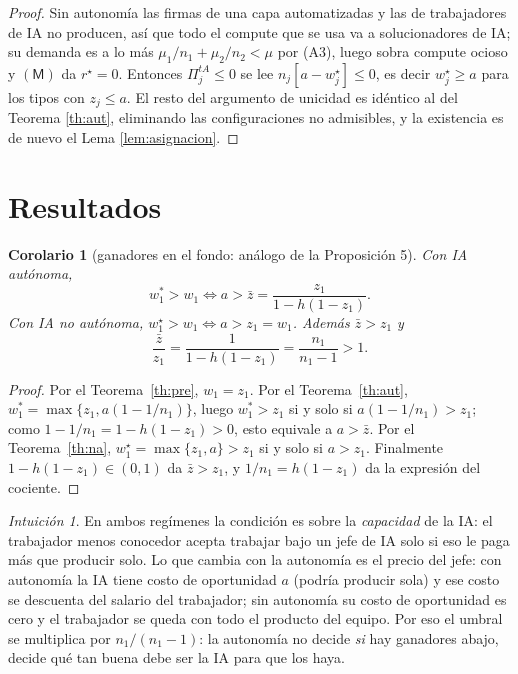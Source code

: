 \documentclass[11pt]{article}
\theoremstyle{plain}
\newtheorem{corolario}{Corolario}
\theoremstyle{definition}
\theoremstyle{remark}
\newtheorem*{intuicion}{Intuición}
\newcommand{\ai}{a}
\newcommand{\Mk}{\mathsf{M}}
\begin{document}
\begin{proof}
Sin autonomía las firmas de una capa automatizadas y las de trabajadores de IA no producen, así que
todo el compute que se usa va a solucionadores de IA; su demanda es a lo más
$\mu_1/n_1+\mu_2/n_2<\mu$ por (A3), luego sobra compute ocioso y $(\Mk)$ da $r^{\star}=0$. Entonces
$\Pi^{tA}_{j}\le0$ se lee $n_j[\ai-w_j^{\star}]\le0$, es decir $w_j^{\star}\ge \ai$ para los tipos con
$z_j\le \ai$. El resto del argumento de unicidad es idéntico al del Teorema \ref{th:aut}, eliminando
las configuraciones no admisibles, y la existencia es de nuevo el Lema \ref{lem:asignacion}.
\end{proof}

\section{Resultados}

\begin{corolario}[ganadores en el fondo: análogo de la Proposición 5]\label{cor:fondo}
Con IA autónoma,
\[
  w_1^{*}>w_1\iff \ai>\bar z=\frac{z_1}{1-h(1-z_1)} .
\]
Con IA no autónoma, $w_1^{\star}>w_1\iff \ai>z_1=w_1$. Además $\bar z>z_1$ y
\[
  \frac{\bar z}{z_1}=\frac{1}{1-h(1-z_1)}=\frac{n_1}{n_1-1}>1 .
\]
\end{corolario}
\begin{proof}
Por el Teorema~\ref{th:pre}, $w_1=z_1$. Por el Teorema~\ref{th:aut},
$w_1^{*}=\max\{z_1,\ai(1-1/n_1)\}$, luego $w_1^{*}>z_1$ si y solo si $\ai(1-1/n_1)>z_1$; como
$1-1/n_1=1-h(1-z_1)>0$, esto equivale a $\ai>\bar z$. Por el Teorema~\ref{th:na},
$w_1^{\star}=\max\{z_1,\ai\}>z_1$ si y solo si $\ai>z_1$. Finalmente
$1-h(1-z_1)\in(0,1)$ da $\bar z>z_1$, y $1/n_1=h(1-z_1)$ da la expresión del cociente.
\end{proof}

\begin{intuicion}
En ambos regímenes la condición es sobre la \emph{capacidad} de la IA: el trabajador menos conocedor
acepta trabajar bajo un jefe de IA solo si eso le paga más que producir solo. Lo que cambia con la
autonomía es el precio del jefe: con autonomía la IA tiene costo de oportunidad $\ai$ (podría producir
sola) y ese costo se descuenta del salario del trabajador; sin autonomía su costo de oportunidad es
cero y el trabajador se queda con todo el producto del equipo. Por eso el umbral se multiplica por
$n_1/(n_1-1)$: la autonomía no decide \emph{si} hay ganadores abajo, decide qué tan buena debe ser la
IA para que los haya.
\end{intuicion}
\end{document}
